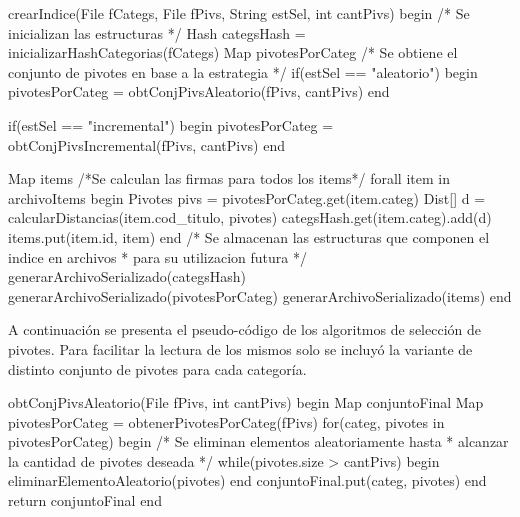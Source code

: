 \begin{algorithm}[caption={Creaci\'on de \'indice}, label={alg1}]
crearIndice(File fCategs, File fPivs, String estSel, int cantPivs)
begin
 /* Se inicializan las estructuras */
 Hash categsHash = inicializarHashCategorias(fCategs)
 Map pivotesPorCateg
 /* Se obtiene el conjunto de pivotes en base a la estrategia */
 if(estSel == "aleatorio")
 begin
  pivotesPorCateg = obtConjPivsAleatorio(fPivs, cantPivs)
 end

 if(estSel == "incremental")
 begin
  pivotesPorCateg = obtConjPivsIncremental(fPivs, cantPivs)
 end

 Map items
 /*Se calculan las firmas para todos los items*/
 forall item in archivoItems
 begin
  Pivotes pivs = pivotesPorCateg.get(item.categ)
  Dist[] d = calcularDistancias(item.cod_titulo, pivotes)
  categsHash.get(item.categ).add(d)
  items.put(item.id, item)
 end
 /* Se almacenan las estructuras que componen el indice en archivos 
  * para su utilizacion futura */
 generarArchivoSerializado(categsHash)
 generarArchivoSerializado(pivotesPorCateg)
 generarArchivoSerializado(items)
end
\end{algorithm}

A continuaci\'on se presenta el pseudo-c\'odigo de los algoritmos de selecci\'on de pivotes. Para facilitar la lectura de los mismos solo se incluy\'o la variante de distinto conjunto de pivotes para cada categor\'ia.

\begin{algorithm}[caption={Selecci\'on de pivotes aleatoria}, label={alg2}]
obtConjPivsAleatorio(File fPivs, int cantPivs)
begin
 Map conjuntoFinal
 Map pivotesPorCateg = obtenerPivotesPorCateg(fPivs)
 for(categ, pivotes in pivotesPorCateg)
 begin
  /* Se eliminan elementos aleatoriamente hasta 
   * alcanzar la cantidad de pivotes deseada */
  while(pivotes.size > cantPivs)
  begin
   eliminarElementoAleatorio(pivotes)
  end
  conjuntoFinal.put(categ, pivotes)
 end
 return conjuntoFinal
end
\end{algorithm}

